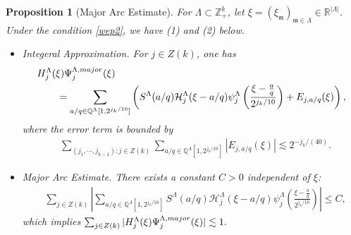 \documentclass[10pt,a4paper]{amsart}
\newtheorem{proposition}{Proposition}\numberwithin{proposition}{section}
\numberwithin{equation}{section}
\begin{document}
\begin{proposition}[Major Arc Estimate] \label{lemm29}
For $\Lambda\subset \mathbb{Z}_+^k $, let $\xi=(\xi_{\mathfrak{m}})_{\mathfrak{m}\in \Lambda}\in \mathbb{R}^{|\Lambda|}$. Under the condition \eqref{wep2},   we have (1) and (2) below. 
\begin{itemize}
\item[(1)]  Integeral Approximation.  For $j\in Z(k)$,
one has
\begin{align}\label{b40}
&H^{\Lambda}_j(\xi) \Psi^{\Lambda,\rm{major}}_{j}(\xi)\nonumber\\
&\qquad=  \sum_{a/q\in \mathbb{Q}^{\Lambda}[1, 2^{j_k/10}]} \left(S^{\Lambda}(a/q) \mathcal{H}^{\Lambda}_j(\xi-a/q)  \psi_j^{\Lambda}\left( \frac{\xi-\frac{a}{q}}{2^{j_{k}/10}} \right)+E_{j,a/q}(\xi)\right), 
\end{align}
where the error term is bounded by
\begin{align*}
&\sum_{(j_1,\cdots,j_{k-1}):j\in Z(k)}\sum_{a/q\in \mathbb{Q}^{\Lambda}[1, 2^{j_k/10}]}|E_{j,a/q}(\xi)|\lesssim 2^{-j_k/(40)}.
\end{align*}
\item[(2)]  Major Arc Estimate.
There exists a constant $C >0$ independent of $\xi$:
\begin{align}\label{23mm}
&\sum_{j\in Z(k) }\left|   \sum_{a/q\in \mathbb{Q}^{\Lambda}[1,2^{j_k/10}]}S^{\Lambda}(a/q)\mathcal{H}_j^{\Lambda}(\xi-a/q) \psi_j^{\Lambda}\left( \frac{\xi-\frac{a}{q}}{2^{j_{k}/10}} \right) \right|
  \le C,
\end{align}
  which  implies 
$
  \sum_{j\in Z(k)} |H^{\Lambda}_j(\xi) \Psi^{\Lambda,\rm{major}}_{j}(\xi)|\lesssim 1.
$
\end{itemize}

\end{proposition} 
\end{document}
